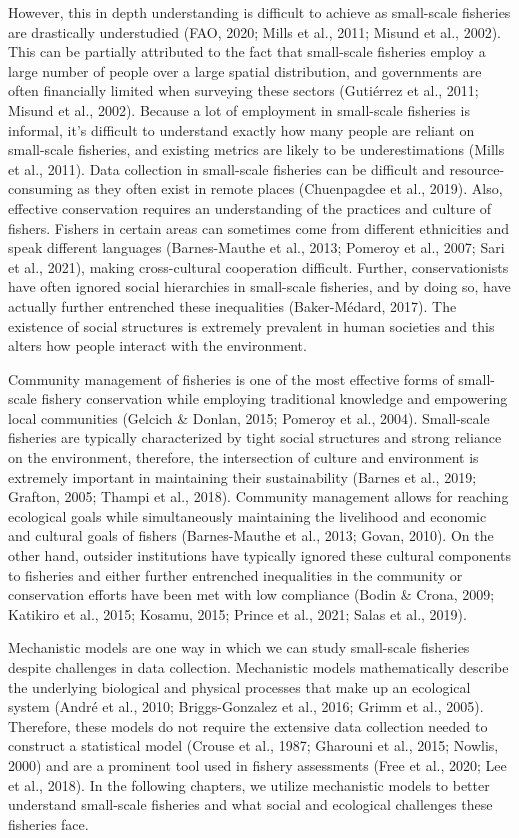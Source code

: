 \documentclass[
]{article}
\begin{document}
However, this in depth understanding is difficult to achieve as small-scale fisheries are drastically understudied (FAO, 2020; Mills et al., 2011; Misund et al., 2002). This can be partially attributed to the fact that small-scale fisheries employ a large number of people over a large spatial distribution, and governments are often financially limited when surveying these sectors (Gutiérrez et al., 2011; Misund et al., 2002). Because a lot of employment in small-scale fisheries is informal, it's difficult to understand exactly how many people are reliant on small-scale fisheries, and existing metrics are likely to be underestimations (Mills et al., 2011). Data collection in small-scale fisheries can be difficult and resource-consuming as they often exist in remote places (Chuenpagdee et al., 2019). Also, effective conservation requires an understanding of the practices and culture of fishers. Fishers in certain areas can sometimes come from different ethnicities and speak different languages (Barnes-Mauthe et al., 2013; Pomeroy et al., 2007; Sari et al., 2021), making cross-cultural cooperation difficult. Further, conservationists have often ignored social hierarchies in small-scale fisheries, and by doing so, have actually further entrenched these inequalities (Baker-Médard, 2017). The existence of social structures is extremely prevalent in human societies and this alters how people interact with the environment.

Community management of fisheries is one of the most effective forms of small-scale fishery conservation while employing traditional knowledge and empowering local communities (Gelcich \& Donlan, 2015; Pomeroy et al., 2004). Small-scale fisheries are typically characterized by tight social structures and strong reliance on the environment, therefore, the intersection of culture and environment is extremely important in maintaining their sustainability (Barnes et al., 2019; Grafton, 2005; Thampi et al., 2018). Community management allows for reaching ecological goals while simultaneously maintaining the livelihood and economic and cultural goals of fishers (Barnes-Mauthe et al., 2013; Govan, 2010). On the other hand, outsider institutions have typically ignored these cultural components to fisheries and either further entrenched inequalities in the community or conservation efforts have been met with low compliance (Bodin \& Crona, 2009; Katikiro et al., 2015; Kosamu, 2015; Prince et al., 2021; Salas et al., 2019).

Mechanistic models are one way in which we can study small-scale fisheries despite challenges in data collection. Mechanistic models mathematically describe the underlying biological and physical processes that make up an ecological system (André et al., 2010; Briggs-Gonzalez et al., 2016; Grimm et al., 2005). Therefore, these models do not require the extensive data collection needed to construct a statistical model (Crouse et al., 1987; Gharouni et al., 2015; Nowlis, 2000) and are a prominent tool used in fishery assessments (Free et al., 2020; Lee et al., 2018). In the following chapters, we utilize mechanistic models to better understand small-scale fisheries and what social and ecological challenges these fisheries face.
\end{document}
